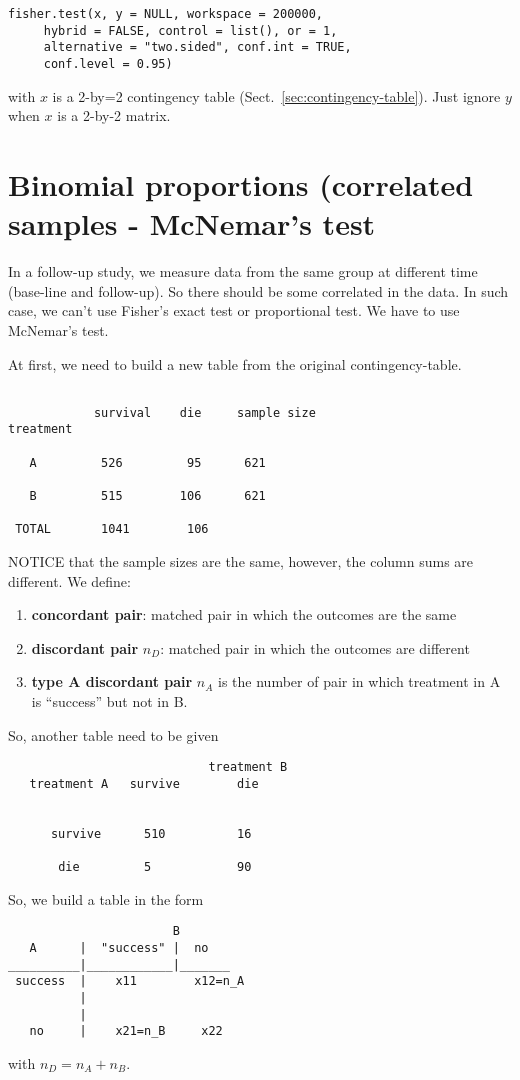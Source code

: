 \begin{lstlisting}
fisher.test(x, y = NULL, workspace = 200000,
     hybrid = FALSE, control = list(), or = 1,
     alternative = "two.sided", conf.int = TRUE,
     conf.level = 0.95)
\end{lstlisting}
with $x$ is a 2-by=2 contingency table
(Sect.~\ref{sec:contingency-table}). Just ignore $y$ when $x$ is a
2-by-2 matrix. 

\section[Mcnemars's test]{Binomial proportions (correlated samples -
  McNemar's test}
\label{sec:mcnemars-test}

In a follow-up study, we measure data from the same group at
different time (base-line and follow-up). So there should be some
correlated in the data. In such case, we can't use Fisher's exact test
or proportional test. We have to use McNemar's test. 

At first, we need to build a new table from the original
contingency-table. 
\begin{verbatim}

            survival    die     sample size
treatment

   A         526         95      621

   B         515        106      621

 TOTAL       1041        106     
\end{verbatim}
NOTICE that the sample sizes are the same, however, the column sums
are different. We define:
\begin{enumerate}
\item {\bf concordant pair}: matched pair in which the outcomes are
  the same
\item {\bf discordant pair} $n_D$: matched pair in which the outcomes are
  different
\item {\bf type A discordant pair} $n_A$ is the number of pair in
  which treatment in A is ``success'' but not in B. 
\end{enumerate}
So, another table need to be given
\begin{verbatim}
                            treatment B
   treatment A   survive        die


      survive      510          16

       die         5            90
\end{verbatim}
So, we build a table in the form
\begin{verbatim}
                       B
   A      |  "success" |  no
__________|____________|_______
 success  |    x11        x12=n_A            
          |
          |
   no     |    x21=n_B     x22
\end{verbatim}
with $n_D = n_A + n_B$.


